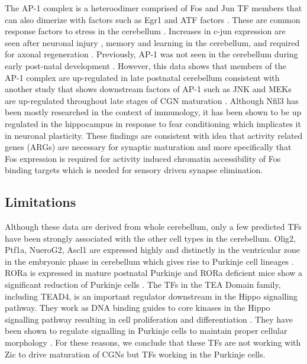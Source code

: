 \documentclass[fleqn,10pt,twocolumn]{wlscirep}
\begin{document}
The AP-1 complex is a heteroodimer comprised of Fos and Jun TF members that can also dimerize with factors such as Egr1 and ATF factors \cite{Raivich2006RoleBrain}. These are common response factors to stress in the cerebellum \cite{Nakamura2015ExpressionActivity, Coffey2000DualNeurons}. Increases in c-jun expression are seen after neuronal injury \cite{Liu2000TranstentorialMice}, memory and learning in the cerebellum, and required for axonal regeneration \cite{Raivich2004TheRegeneration, Raivich2006RoleBrain}. Previously, AP-1 was not seen in the cerebellum during early post-natal development \cite{Guerrini1997Glutamate-DependentDevelopment}. However, this data shows that members of the AP-1 complex are up-regulated in late postnatal cerebellum consistent with another study that shows downstream factors of AP-1 such as JNK and MEKs are up-regulated throughout late stages of CGN maturation \cite{Coffey2000DualNeurons}. Although Nfil3 has been mostly researched in the context of immunology, it has been shown to be up regulated in the hippocampus in response to fear conditioning \cite{Mizuno2020Long-lastingConditioning} which implicates it in neuronal plasticity. These findings are consistent with idea that activity related genes (ARGs) are necessary for synaptic maturation\cite{West2011NeuronalFunction} and more specifically that Fos expression is required for activity induced chromatin accessibility of Fos binding targets\cite{Su2017NeuronalBrain} which is needed for sensory driven synapse elimination. 


\subsection*{Limitations}
Although these data are derived from whole cerebellum, only a few predicted TFs have been strongly associated with the other cell types in the cerebellum. Olig2, Ptf1a, NueroG2, Ascl1 are expressed highly and distinctly in the ventricular zone in the embryonic phase in cerebellum which gives rise to Purkinje cell lineages \cite{Lowenstein2021Olig3Development}. RORa is expressed in mature postnatal Purkinje and RORa deficient mice show a significant reduction of Purkinje cells \cite{Jetten2006RetinoidrelatedDevelopment}. The TFs in the TEA Domain family, including TEAD4, is an important regulator downstream in the Hippo signalling pathway. They work as DNA binding guides to core kinases in the Hippo signalling pathway resulting in cell proliferation and differentiation  \cite{Lavado2018TheNumber, Jin2020TheDiseases}. They have been shown to regulate signalling in Purkinje cells to maintain proper cellular morphology \cite{Jin2020TheDiseases}. For these reasons, we conclude that these TFs are not working with Zic to drive maturation of CGNs but TFs working in the Purkinje cells.
\end{document}
